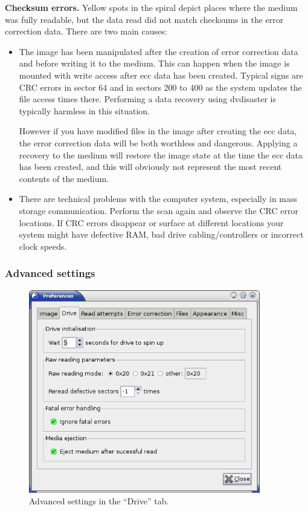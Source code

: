 {\bf Checksum errors.} Yellow spots in the spiral depict places
where the medium was fully readable, but the data read did not
match checksums in the error correction data. There are two main causes:

\begin{itemize}
\item The image has been manipulated after the creation of
  error correction data and before writing it to the medium.
  This can happen when the image is mounted with
  write access after ecc data has been created. Typical signs are
  CRC errors in sector 64 and in sectors 200 to 400 as the system
  updates the file access times there. Performing a data recovery
  using dvdisaster is typically harmless in this situation.

  \medskip

  However if you have modified files in the image after
  creating the ecc data, the error correction data will be both
  worthless and dangerous. Applying a recovery to the medium will
  restore the image state at the time the ecc data has been created,
  and this will obviously not represent the most recent contents of
  the medium.

\item There are technical problems with the computer system,
  especially in mass storage communication. Perform the scan again
  and observe the CRC error locations. If CRC errors disappear
  or surface at different locations your system might have
  defective RAM, bad drive cabling/controllers or incorrect clock speeds.
\end{itemize}

\newpage
\subsubsection{Advanced settings}
\label{howto-scan-advanced-settings}

\begin{figure}[h]
\centerline{\includegraphics[width=0.9\textwidth]{screenshots/scan-prefs-drive-adv.png}}
\caption{Advanced settings in the ``Drive'' tab.}  
\label{howto-scan-prefs-drive-adv}
\end{figure}

